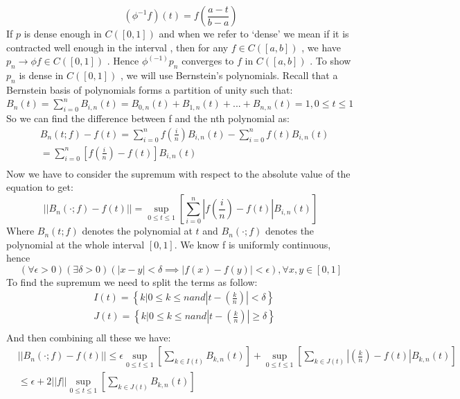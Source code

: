 \documentclass{article}
\begin{document}
\begin{equation}
(\phi^{-1}f)(t)=f\left(\frac{a-t}{b-a}\right)    
\end{equation}
If $p$ is dense enough in $C([0,1])$ and when we refer to ‘dense’ we mean if it is contracted well enough in the interval , then for any $f\in C([a,b])$  , we have $p_n \rightarrow{} \phi f\in C([0,1])$ . Hence $\phi^(-1)p_n$ converges to $f$ in $C([a,b])$ . To show $p_n$ is dense in $C([ 0,1])$ , we will use Bernstein’s polynomials. Recall that a Bernstein basis of polynomials forms a partition of unity such that:
\newline
$B_n(t)=\sum_{i=0}^nB_{i,n}(t)=B_{0,n}(t)+B_{1,n}(t)+...+B_{n,n}(t)=1, 0\leq t\leq1$\newline 
So we can find the difference between f and the nth polynomial as:
\begin{align*}
&B_n(t;f)-f(t)=\sum_{i=0}^nf\left(\frac{i}{n}\right)B_{i,n}(t)-\sum_{i=0}^nf(t)B_{i,n}(t)\\
&=\sum_{i=0}^n\left[f\left(\frac{i}{n}\right)-f(t)\right]B_{i,n}(t)\\
\end{align*}
Now we have to consider the supremum with respect to the absolute value of the equation to get:
\begin{equation}
||B_n(\cdot;f)-f(t)||=\sup_{0\leq t\leq 1}\left[\sum_{i=0}^n\left|f\left(\frac{i}{n}\right)-f(t)\right|B_{i,n}(t)\right]    
\end{equation}
Where $B_n(t;f)$ denotes the polynomial at $t$ and $B_n(\cdot;f)$ denotes the polynomial at the whole interval $[0,1]$. We know f is uniformly continuous, hence 
\begin{equation}
(\forall\epsilon>0)(\exists\delta>0)(|x-y|<\delta\implies|f(x)-f(y)|<\epsilon), \forall x,y\in[0,1]    
\end{equation}
To find the supremum we need to split the terms as follow:
\begin{align*}
&I(t)=\left\{k|0\leq k\leq n and \left|t-\left(\frac{k}{n}\right)\right|<\delta\right\}\\
&J(t)=\left\{k|0\leq k\leq n and \left|t-\left(\frac{k}{n}\right)\right|\geq\delta\right\}\\
\end{align*}
And then combining all these we have:
\begin{align*}
&||B_n(\cdot;f)-f(t)||\leq\epsilon\sup_{0\leq t\leq 1}\left[\sum_{k\in I(t)}B_{k,n}(t)\right]+\sup_{0\leq t\leq 1}\left[\sum_{k\in J(t)}\left|\left(\frac{k}{n}\right)-f(t)\right|B_{k,n}(t)\right]\\
&\leq\epsilon+2||f||\sup_{0\leq t\leq 1}\left[\sum_{k\in J(t)}B_{k,n}(t)\right]\\
\end{align*}
\end{document}
